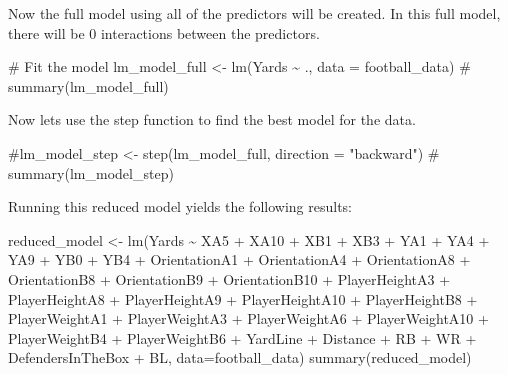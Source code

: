 \documentclass[
  super,
  preprint,
  3p]{elsarticle}
\newenvironment{Shaded}{\begin{snugshade}}{\end{snugshade}}
\newcommand{\AttributeTok}[1]{\textcolor[rgb]{0.40,0.45,0.13}{#1}}
\newcommand{\CommentTok}[1]{\textcolor[rgb]{0.37,0.37,0.37}{#1}}
\newcommand{\FunctionTok}[1]{\textcolor[rgb]{0.28,0.35,0.67}{#1}}
\newcommand{\NormalTok}[1]{\textcolor[rgb]{0.00,0.23,0.31}{#1}}
\newcommand{\OtherTok}[1]{\textcolor[rgb]{0.00,0.23,0.31}{#1}}
\newcommand{\SpecialCharTok}[1]{\textcolor[rgb]{0.37,0.37,0.37}{#1}}
\begin{document}
Now the full model using all of the predictors will be created. In this
full model, there will be 0 interactions between the predictors.

\begin{Shaded}
\begin{Highlighting}[]
\CommentTok{\# Fit the model}
\NormalTok{lm\_model\_full }\OtherTok{\textless{}{-}} \FunctionTok{lm}\NormalTok{(Yards }\SpecialCharTok{\textasciitilde{}}\NormalTok{ ., }\AttributeTok{data =}\NormalTok{ football\_data)}
\CommentTok{\# summary(lm\_model\_full)}
\end{Highlighting}
\end{Shaded}

Now lets use the step function to find the best model for the data.

\begin{Shaded}
\begin{Highlighting}[]
\CommentTok{\#lm\_model\_step \textless{}{-} step(lm\_model\_full, direction = "backward")}
\CommentTok{\# summary(lm\_model\_step)}
\end{Highlighting}
\end{Shaded}

Running this reduced model yields the following results:

\begin{Shaded}
\begin{Highlighting}[]
\NormalTok{reduced\_model }\OtherTok{\textless{}{-}} \FunctionTok{lm}\NormalTok{(Yards }\SpecialCharTok{\textasciitilde{}}\NormalTok{ XA5 }\SpecialCharTok{+}\NormalTok{ XA10 }\SpecialCharTok{+}\NormalTok{ XB1 }\SpecialCharTok{+}\NormalTok{ XB3 }\SpecialCharTok{+}\NormalTok{ YA1 }\SpecialCharTok{+}\NormalTok{ YA4 }\SpecialCharTok{+}\NormalTok{ YA9 }\SpecialCharTok{+}\NormalTok{ YB0 }\SpecialCharTok{+}\NormalTok{ YB4 }\SpecialCharTok{+}\NormalTok{ OrientationA1 }\SpecialCharTok{+}\NormalTok{ OrientationA4 }\SpecialCharTok{+}\NormalTok{ OrientationA8 }\SpecialCharTok{+}\NormalTok{ OrientationB8 }\SpecialCharTok{+}\NormalTok{ OrientationB9 }\SpecialCharTok{+}\NormalTok{ OrientationB10 }\SpecialCharTok{+}\NormalTok{ PlayerHeightA3 }\SpecialCharTok{+}\NormalTok{ PlayerHeightA8 }\SpecialCharTok{+}\NormalTok{ PlayerHeightA9 }\SpecialCharTok{+}\NormalTok{ PlayerHeightA10 }\SpecialCharTok{+}\NormalTok{ PlayerHeightB8 }\SpecialCharTok{+}\NormalTok{ PlayerWeightA1 }\SpecialCharTok{+}\NormalTok{ PlayerWeightA3 }\SpecialCharTok{+}\NormalTok{ PlayerWeightA6 }\SpecialCharTok{+}\NormalTok{ PlayerWeightA10 }\SpecialCharTok{+}\NormalTok{ PlayerWeightB4 }\SpecialCharTok{+}\NormalTok{ PlayerWeightB6 }\SpecialCharTok{+}\NormalTok{ YardLine }\SpecialCharTok{+}\NormalTok{ Distance }\SpecialCharTok{+}\NormalTok{ RB }\SpecialCharTok{+}\NormalTok{ WR }\SpecialCharTok{+}\NormalTok{ DefendersInTheBox }\SpecialCharTok{+}\NormalTok{ BL, }\AttributeTok{data=}\NormalTok{football\_data)}
\FunctionTok{summary}\NormalTok{(reduced\_model)}
\end{Highlighting}
\end{Shaded}
\end{document}
